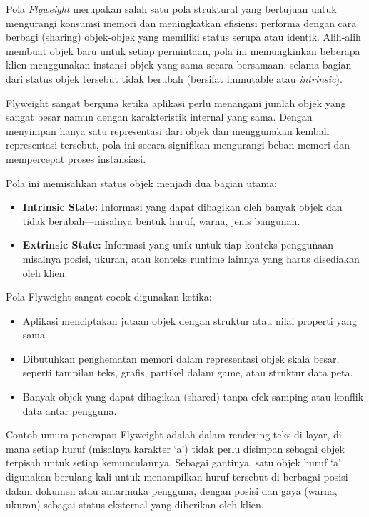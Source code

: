 Pola \textit{Flyweight} merupakan salah satu pola struktural yang bertujuan untuk mengurangi konsumsi memori dan meningkatkan efisiensi performa dengan cara berbagi (sharing) objek-objek yang memiliki status serupa atau identik. Alih-alih membuat objek baru untuk setiap permintaan, pola ini memungkinkan beberapa klien menggunakan instansi objek yang sama secara bersamaan, selama bagian dari status objek tersebut tidak berubah (bersifat immutable atau \textit{intrinsic}).

Flyweight sangat berguna ketika aplikasi perlu menangani jumlah objek yang sangat besar namun dengan karakteristik internal yang sama. Dengan menyimpan hanya satu representasi dari objek dan menggunakan kembali representasi tersebut, pola ini secara signifikan mengurangi beban memori dan mempercepat proses instansiasi.

Pola ini memisahkan status objek menjadi dua bagian utama:
\begin{itemize}
	\item \textbf{Intrinsic State:} Informasi yang dapat dibagikan oleh banyak objek dan tidak berubah—misalnya bentuk huruf, warna, jenis bangunan.
	\item \textbf{Extrinsic State:} Informasi yang unik untuk tiap konteks penggunaan—misalnya posisi, ukuran, atau konteks runtime lainnya yang harus disediakan oleh klien.
\end{itemize}

Pola Flyweight sangat cocok digunakan ketika:
\begin{itemize}
	\item Aplikasi menciptakan jutaan objek dengan struktur atau nilai properti yang sama.
	\item Dibutuhkan penghematan memori dalam representasi objek skala besar, seperti tampilan teks, grafis, partikel dalam game, atau struktur data peta.
	\item Banyak objek yang dapat dibagikan (shared) tanpa efek samping atau konflik data antar pengguna.
\end{itemize}

Contoh umum penerapan Flyweight adalah dalam rendering teks di layar, di mana setiap huruf (misalnya karakter ‘a’) tidak perlu disimpan sebagai objek terpisah untuk setiap kemunculannya. Sebagai gantinya, satu objek huruf ‘a’ digunakan berulang kali untuk menampilkan huruf tersebut di berbagai posisi dalam dokumen atau antarmuka pengguna, dengan posisi dan gaya (warna, ukuran) sebagai status eksternal yang diberikan oleh klien.

